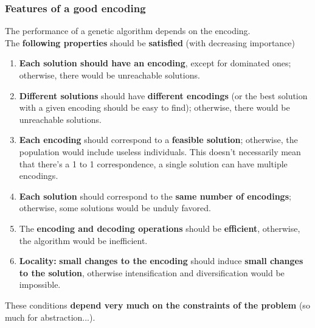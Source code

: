 \documentclass[11pt]{article}
\begin{document}
	\newpage
	
	\subsubsection{Features of a good encoding}
	The performance of a genetic algorithm depends on the encoding.\\
	
	The \textbf{following properties} should be \textbf{satisfied} (with decreasing importance)
	\begin{enumerate}
		\item \textbf{Each solution should have an encoding}, except for dominated ones; otherwise, there would be unreachable solutions.\\
		
		\item \textbf{Different solutions} should have \textbf{different encodings} (or the best solution with a given encoding should be easy to find); otherwise, there would be unreachable solutions. \\
		
		\item \textbf{Each encoding} should correspond to a \textbf{feasible solution}; otherwise, the population would include useless individuals. This doesn't necessarily mean that there's a 1 to 1 correspondence, a single solution can have multiple encodings.\\
		
		\item \textbf{Each solution} should correspond to the \textbf{same number of encodings}; otherwise, some solutions would be unduly favored.\\
		
		\item The \textbf{encoding and decoding operations} should be \textbf{efficient}, otherwise, the algorithm would be inefficient.\\
		
		\item \textbf{Locality:} \textbf{small changes to the encoding} should induce \textbf{small changes to the solution}, otherwise intensification and diversification would be impossible.\\
	\end{enumerate}
	
	These conditions \textbf{depend very much on the constraints of the problem} (so much for abstraction...).\\
	
\end{document}
